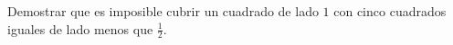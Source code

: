 Demostrar que es imposible cubrir un cuadrado de lado $1$ con cinco cuadrados iguales de lado menos que $\frac{1}{2}$.

